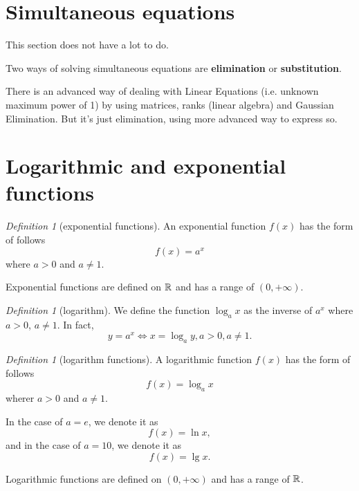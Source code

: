 \documentclass[8pt]{article}
\theoremstyle{remark}
\newtheorem{definition}[theorem]{Definition}
\begin{document}
    \section{Simultaneous equations}
        
        This section does not have a lot to do.

        Two ways of solving simultaneous equations are \textbf{elimination} or \textbf{substitution}.

        There is an advanced way of dealing with Linear Equations (i.e. unknown maximum power of 1) by using matrices, ranks (linear algebra) and Gaussian Elimination. But it's just elimination, using more advanced way to express so.
    
    \section{Logarithmic and exponential functions}
        \begin{definition}[exponential functions]
            An exponential function $f(x)$ has the form of follows
            $$
                f(x) = a^x
            $$
            where $a > 0$ and $a \neq 1$.

            Exponential functions are defined on $\mathbb{R}$ and has a range of $(0, +\infty)$.
        \end{definition}

        \begin{definition}[logarithm]
            We define the function $\log_a x$ as the inverse of $a^x$ where $a > 0$, $a \neq 1$. In fact,
            $$
                y = a^x \iff x = \log_a y, a > 0, a \neq 1.
            $$
        \end{definition}

        \begin{definition}[logarithm functions]
            A logarithmic function $f(x)$ has the form of follows
            $$
                f(x) = \log_a x
            $$ 
            wherer $a > 0$ and $a \neq 1$.

            In the case of $a = e$, we denote it as
            $$
                f(x) = \ln x,
            $$
            and in the case of $a = 10$, we denote it as
            $$
                f(x) = \lg x.
            $$

            Logarithmic functions are defined on $(0, +\infty)$ and has a range of $\mathbb{R}$.
        \end{definition}
    
\end{document}
